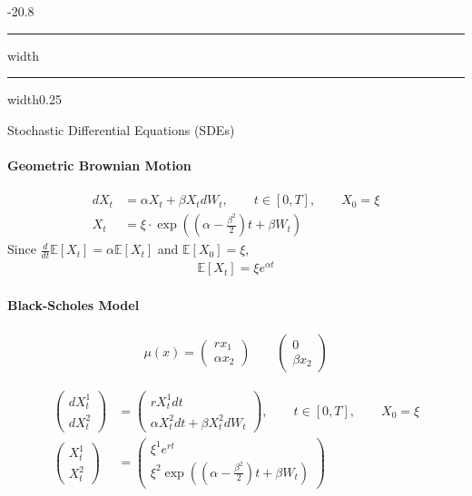 \documentclass[a4paper,landscape,7pt,fleqn]{scrartcl}
\makeatletter
\renewcommand{\section}{\@startsection{section}{1}{0mm}%
{-2\baselineskip}{0.8\baselineskip}%
{\hrule depth 0.2pt width\columnwidth\hrule depth1.5pt
width0.25\columnwidth\vspace*{1.2em}\Large\bfseries}}
\makeatother
\begin{document}
\begin{multicols*}{3}
\section{Stochastic Differential Equations (SDEs)}

\paragraph{Geometric Brownian Motion}

\begin{align*}
dX_t &= \alpha X_t + \beta X_t dW_t, \qquad t \in [0,T], \qquad X_0 = \xi \\
X_t &= \xi \cdot \exp \left( \left( \alpha - \frac{\beta^2}{2} \right) t + \beta W_t \right)
\end{align*}
Since $\frac{d}{dt} \mathbb{E}[X_t] = \alpha \mathbb{E}[X_t]$ and $\mathbb{E}[X_0] = \xi$,
\begin{align*}
\mathbb{E}[X_t] = \xi e^{\alpha t}
\end{align*}

\paragraph{Black-Scholes Model}

\begin{align*}
\mu(x) = \begin{pmatrix}
r x_1 \\ \alpha x_2
\end{pmatrix} \qquad
\begin{pmatrix}
0 \\ \beta x_2
\end{pmatrix}
\end{align*}

\begin{align*}
\begin{pmatrix}
dX_t^1 \\ dX_t^2
\end{pmatrix} &=
\begin{pmatrix}
r X_t^1 dt \\ \alpha X_t^2 dt + \beta X_t^2 dW_t
\end{pmatrix}, \qquad t \in [0,T], \qquad X_0 = \xi \\
\begin{pmatrix}
X_t^1 \\ X_t^2
\end{pmatrix} &=
\begin{pmatrix}
\xi^1 e^{r t} \\ \xi^2 \exp \left( \left( \alpha - \frac{\beta^2}{2} \right) t + \beta W_t \right)
\end{pmatrix}
\end{align*}


\end{multicols*}
\end{document}
